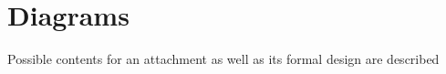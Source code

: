 %
%

\chapter{Diagrams}

Possible contents for an attachment as well as its formal design are described 

